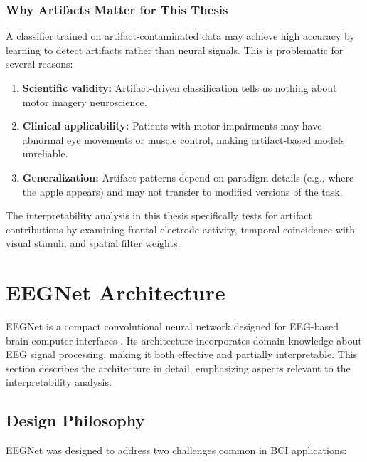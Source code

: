 \subsubsection{Why Artifacts Matter for This Thesis}

A classifier trained on artifact-contaminated data may achieve high accuracy by learning to detect artifacts rather than neural signals. This is problematic for several reasons:

\begin{enumerate}
    \item \textbf{Scientific validity:} Artifact-driven classification tells us nothing about motor imagery neuroscience.
    \item \textbf{Clinical applicability:} Patients with motor impairments may have abnormal eye movements or muscle control, making artifact-based models unreliable.
    \item \textbf{Generalization:} Artifact patterns depend on paradigm details (e.g., where the apple appears) and may not transfer to modified versions of the task.
\end{enumerate}

The interpretability analysis in this thesis specifically tests for artifact contributions by examining frontal electrode activity, temporal coincidence with visual stimuli, and spatial filter weights.


\section{EEGNet Architecture}
\label{sec:bg_eegnet}

EEGNet is a compact convolutional neural network designed for EEG-based brain-computer interfaces \cite{lawhern2018eegnet}. Its architecture incorporates domain knowledge about EEG signal processing, making it both effective and partially interpretable. This section describes the architecture in detail, emphasizing aspects relevant to the interpretability analysis.


\subsection{Design Philosophy}
\label{subsec:bg_eegnet_philosophy}

EEGNet was designed to address two challenges common in BCI applications:

